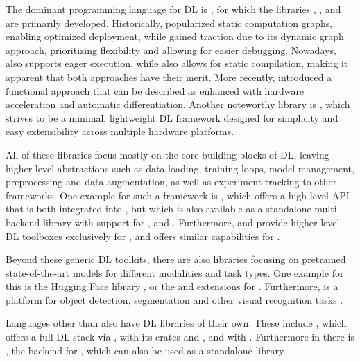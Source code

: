 \documentclass[article]{jss}
\theoremstyle{definition}
\begin{document}
The dominant programming language for DL is  \citep{ref-van1995python}, for which the libraries  \citep{ref-abadi2016tensorflow},  \citep{ref-pytorch}, and  \citep{ref-jax2018github} are primarily developed.
Historically,  popularized static computation graphs, enabling optimized deployment, while  gained traction due to its dynamic graph approach, prioritizing flexibility and allowing for easier debugging.
Nowadays,  also supports eager execution, while  also allows for static compilation, making it apparent that both approaches have their merit.
More recently,  introduced a functional approach that can be described as  \citep{ref-harris2020array} enhanced with hardware acceleration and automatic differentiation.
Another noteworthy \python{} library is  \citep{ref-tinygrad}, which strives to be a minimal, lightweight DL framework designed for simplicity and easy extensibility across multiple hardware platforms.

All of these libraries focus mostly on the core building blocks of DL, leaving higher-level abstractions such as data loading, training loops, model management, preprocessing and data augmentation, as well as experiment tracking to other frameworks.
One example for such a framework is  \citep{ref-chollet2018keras}, which offers a high-level API that is both integrated into , but which is also available as a standalone multi-backend library with support for ,  and . Furthermore,  \citep{ref-lightning2019} and  provide higher level DL toolboxes exclusively for , and  \citep{ref-trax} offers similar capabilities for .

Beyond these generic DL toolkits, there are also libraries focusing on pretrained state-of-the-art models for different modalities and task types.
One example for this is the Hugging Face  library \citep{ref-wolf-etal-2020-transformers}, or the  \citep{ref-marcel2010torchvision} and  \citep{ref-yang2022torchaudio} extensions for \pytorch.
Furthermore,  is a platform for object detection, segmentation and other visual recognition tasks \citep{ref-wu2019detectron2}.

Languages other than  also have DL libraries of their own.
These include  \citep{ref-bezanson2017julia}, which offers a full DL stack via \flux{} \citep{ref-innes2018flux}, \rust{} \citep{ref-matsakis2014rust} with its crates  \citep{ref-burn} and  \citep{ref-candle}, and  \citep{ref-go} with  \citep{ref-gomlx}.
Furthermore in \cpp{} there is , the \cpp{} backend for \pytorch{}, which can also be used as a standalone \cpp{} library.
\end{document}

